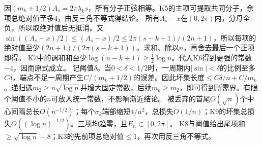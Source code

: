 \documentclass[UTF8,fontset=fandol,11pt]{ctexart}
\begin{document}
因$(m_k+1/2)A_s=2\pi\lambda_ks$，所有分子正弦相等。K5的主项可提取共同分子，余项总绝对值至多$4$，由反三角不等式得结论。
所有$A_s-x$在$(0,2\pi)$内，分母全负，所以取绝对值后无抵消。又$\sin((A_s-x)/2)\le(A_s-x)/2\le2\pi(s-k+1)/(2n+1)$，所以每项的绝对值至少$(2n+1)/(2\pi(s-k+1))$。求和、除以$n$，再舍去最后一个正项即得。
K7中的调和和至少$\log(n-k+1)\ge\frac12\log n$。代入K6得到更强的常数$-4$，因而原式成立。
记阈值$\delta$。当$0<\delta<1/2$时，一周期内$|\sin|<\delta$的比例至多$C\delta$，端点不足一周期产生$C/(m_k+1/2)$的误差。因此坏集长度$\le C\delta/n+C/m_k$。递归选$m_2\ge n\sqrt{\log n}$并增大固定常数，后续$m_k\ge m_2$，即可得到所需界。有限个阈值不小的$n$可放入统一常数，不影响渐近结论。
被丢弃的首尾$O(\sqrt n)$个中心间隔总长$O(n^{-1/2})$；每个$\sigma_k$端部缩短$4/n^2$，总损失$O(1/n)$；K9的坏集总损失$O((\log n)^{-1/2})$。三项均趋零，且$E_n\subset[0,2\pi]$。
K8与阈值给出尾项和$\ge\sqrt{\log n}-8$；K3的先前项总绝对值$\le1$，再次用反三角不等式。
\end{document}
